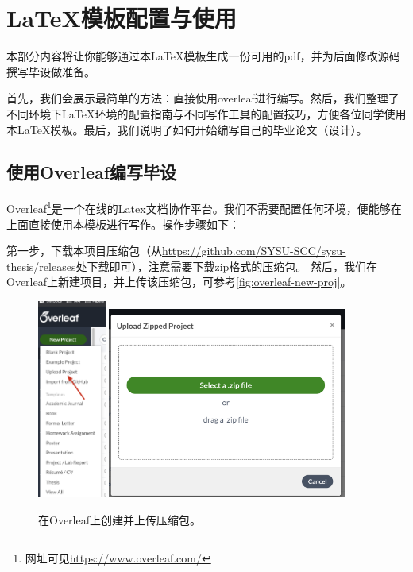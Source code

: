 \chapter{\LaTeX 模板配置与使用}


\label{cha:sysu-thesis-latex-install-guide}

本部分内容将让你能够通过本\LaTeX 模板生成一份可用的pdf，并为后面修改源码撰写毕设做准备。

首先，我们会展示最简单的方法：直接使用overleaf进行编写。然后，我们整理了不同环境下\LaTeX 环境的配置指南与不同写作工具的配置技巧，方便各位同学使用本\LaTeX 模板。最后，我们说明了如何开始编写自己的毕业论文（设计）。


\section{使用Overleaf编写毕设}

Overleaf\footnote{网址可见\url{https://www.overleaf.com/}}是一个在线的Latex文档协作平台。我们不需要配置任何环境，便能够在上面直接使用本模板进行写作。操作步骤如下：

第一步，下载本项目压缩包（从\url{https://github.com/SYSU-SCC/sysu-thesis/releases}处下载即可），注意需要下载zip格式的压缩包。
然后，我们在Overleaf上新建项目，并上传该压缩包，可参考\autoref{fig:overleaf-new-proj}。


\begin{figure}[h]
	\centering
	\includegraphics[width=0.2\textwidth]{image/chap03/overleaf-create-proj.jpg}
	\includegraphics[width=0.7\textwidth]{image/chap03/overleaf-upload-proj.jpg}
	\caption{在Overleaf上创建并上传压缩包。}
	\label{fig:overleaf-new-proj}
\end{figure}

